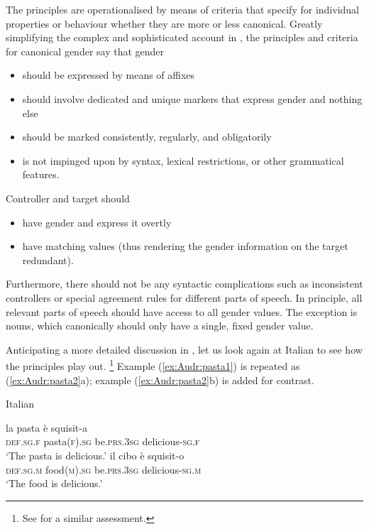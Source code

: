 \documentclass[output=collectionpaper]{langsci/langscibook}
\begin{document}
The principles are operationalised by means of criteria that specify for individual properties or behaviour whether they are more or less canonical. Greatly simplifying the complex and sophisticated account in \citet{Corbett2016}, the principles and criteria for canonical gender say that gender

\begin{itemize}
\item
should be expressed by means of affixes

\item
should involve dedicated and unique markers that express gender and nothing else

\item
should be marked consistently, regularly, and obligatorily

\item
is not impinged upon by syntax, lexical restrictions, or other grammatical features.
\end{itemize}

Controller and target should

\begin{itemize}
\item
have gender and express it overtly

\item
have matching values (thus rendering the gender information on the target redundant).
\end{itemize}

Furthermore, there should not be any syntactic complications such as inconsistent controllers or special agreement rules for different parts of speech. In principle, all relevant parts of speech should have access to all gender values. The exception is nouns, which \textendash{} canonically \textendash{} should only have a single, fixed gender value.

Anticipating a more detailed discussion in , let us look again at Italian to see how the principles play out.%
\footnote{See \citet[3]{Fedden2017} for a similar assessment.} %
Example (\ref{ex:Audr:pasta1}) is repeated as (\ref{ex:Audr:pasta2}a); example (\ref{ex:Audr:pasta2}b) is added for contrast.

\ea
\label{ex:Audr:pasta2}
Italian\\
\begin{xlist}
\ex
\gll la pasta è squisit-a          \\
     \textsc{def.sg.f} pasta\textsc{(f).sg} be.\textsc{prs.3sg} delicious-\textsc{sg.f}\\
\glt `The pasta is delicious.'
\ex
\gll il cibo è squisit-o          \\
     \textsc{def.sg.m} food\textsc{(m).sg} be.\textsc{prs.3sg} delicious-\textsc{sg.m}\\
\glt `The food is delicious.'
\end{xlist}
\z
\end{document}
